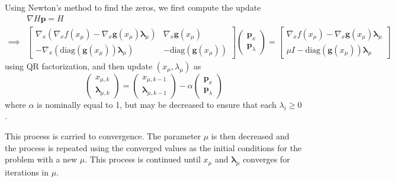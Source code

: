 \documentclass{article}
\begin{document}
	Using Newton's method to find the zeros, we first compute the update 
	\begin{align*}
	& \nabla H \mathbf{p} = H \\
	\implies & \begin{bmatrix}
					\nabla_x\left(\nabla_x f(x_\mu) - \nabla_x \mathbf{g}(x_\mu) \boldsymbol{\lambda}_\mu\right) & \nabla_x \mathbf{g}(x_\mu) \\
					-\nabla_x\left(\text{diag}(\mathbf{g}(x_\mu))\boldsymbol{\lambda}_{\mu}\right) & -\text{diag}(\mathbf{g}(x_\mu))
               \end{bmatrix}
               \begin{pmatrix} \mathbf{p}_x \\ \mathbf{p}_\lambda \end{pmatrix}	
               = \begin{bmatrix}
 					\nabla_x f(x_\mu) - \nabla_x \mathbf{g}(x_\mu) \boldsymbol{\lambda}_\mu \\
 					\mu I - \text{diag}(\mathbf{g}(x_\mu))\boldsymbol{\lambda}_{\mu}
 				\end{bmatrix}
	\end{align*}
	using QR factorization, and then update $(x_\mu, \lambda_\mu)$ as
\[
	\begin{pmatrix} x_{\mu, k} \\ \boldsymbol{\lambda}_{\mu, k} \end{pmatrix} 
	= \begin{pmatrix} x_{\mu, k-1} \\ \boldsymbol{\lambda}_{\mu, k-1} \end{pmatrix} - \alpha \begin{pmatrix} \mathbf{p}_x \\ \mathbf{p}_{\lambda} \end{pmatrix}
\]
where $\alpha$ is nominally equal to 1, but may be decreased to ensure that each $\lambda_i\geq 0$.

This process is carried to convergence.  The parameter $\mu$ is then decreased and the process is repeated using the converged values as the initial conditions for the problem with a new $\mu$.  This process is continued until $x_\mu$ and $\boldsymbol{\lambda}_{\mu}$ converges for iterations in $\mu$.
	
	
	

	












\end{document}
